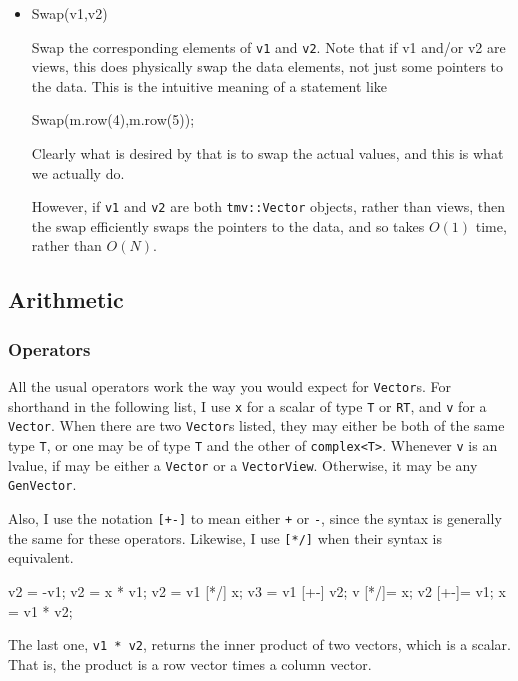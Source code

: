 \documentclass[twoside,letterpaper,11pt]{article}
\renewcommand{\tt}[1]{{\lstinline {#1}}}
\begin{document}
\begin{itemize}
\item
\begin{tmvcode}
Swap(v1,v2)
\end{tmvcode}
Swap the corresponding elements of \tt{v1} and \tt{v2}.  Note that if v1 and/or v2 are
views, this does physically
swap the data elements, not just some pointers to the data.  This is the intuitive 
meaning of a statement like
\begin{tmvcode}
Swap(m.row(4),m.row(5));
\end{tmvcode}
Clearly what is desired by that is to swap the actual values, and this is what we actually do.

However, if \tt{v1} and \tt{v2} are both \tt{tmv::Vector} objects, rather than views, then the 
swap efficiently swaps the pointers to the data, and so takes $O(1)$ time, rather than
$O(N)$.

\end{itemize}

\subsection{Arithmetic}
\label{Vector_Arithmetic}

\subsubsection{Operators}

All the usual operators work the way you would expect for \tt{Vector}s.  For shorthand in the 
following list, I use \tt{x} for a scalar of type \tt{T} or \tt{RT}, and
\tt{v} for a \tt{Vector}.  When there are two \tt{Vector}s
listed, they may either be both of the same type \tt{T}, or one may be of type 
\tt{T} and the other of \tt{complex<T>}.  Whenever \tt{v} is an lvalue,
if may be either a \tt{Vector} or a \tt{VectorView}.  Otherwise, it may be any \tt{GenVector}.

Also, I use the notation \tt{[+-]} to mean either \tt{+} or \tt{-}, since
the syntax is generally the same for these operators.
Likewise, I use \tt{[*/]} when their syntax is equivalent.

\begin{tmvcode}
v2 = -v1;
v2 = x * v1;
v2 = v1 [*/] x;
v3 = v1 [+-] v2;
v [*/]= x;
v2 [+-]= v1;
x = v1 * v2;
\end{tmvcode}
The last one, \tt{v1 * v2},
returns the inner product of two vectors, which is a scalar.  That is, the product
is a row vector times a column vector.  
\end{document}

